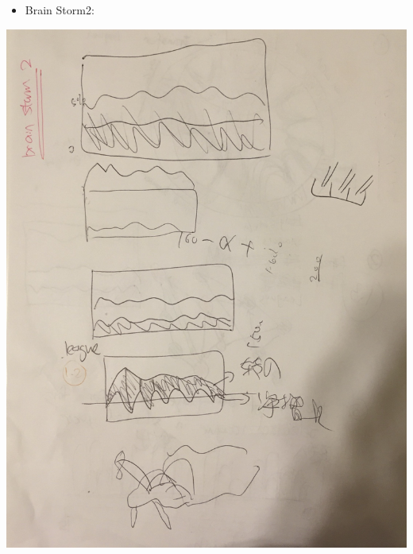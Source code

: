 \documentclass[11pt]{article}
\begin{document}
\begin{itemize}
\item Brain Storm2:
\end{itemize}
\includegraphics[width=.9\linewidth]{Design2.png}
\end{document}
